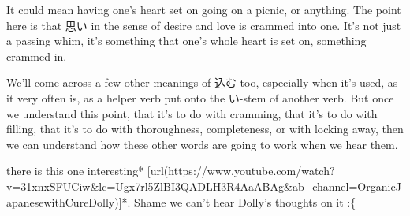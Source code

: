 It could mean having one's heart set on going on a picnic, or anything. The point here is that 思い in the sense of desire and love is crammed into one. It's not just a passing whim, it's something that one's whole heart is set on,\crlf
something crammed in.

\thinrule

We'll come across a few other meanings of 込む too, especially when it's used,\crlf
as it very often is, as a helper verb put onto the い-stem of another verb. But once we understand this point, that it's to do with cramming, that it's to do with filling, that it's to do with thoroughness, completeness, or with locking away, then we can understand how these other words are going to work when we hear them.

there is this one interesting* [url(https://www.youtube.com/watch?v=31xnxSFUCiw&lc=Ugx7rl5ZlBI3QADLH3R4AaABAg&ab_channel=OrganicJapanesewithCureDolly)]*. Shame we can't hear Dolly's thoughts on it :\{

\stopsectionlevel

\stopsectionlevel

\stopsectionlevel
